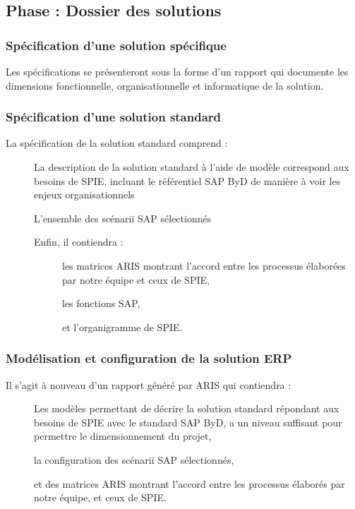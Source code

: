 \subsection{Phase : Dossier des solutions}

\subsubsection{Spécification d’une solution spécifique}

Les spécifications se présenteront sous la forme d’un rapport qui documente les dimensions fonctionnelle, organisationnelle et informatique de la solution.

\subsubsection{Spécification d’une solution standard}

La spécification de la solution standard comprend : \\
\begin{description}
    \item[\textbullet] La description de la solution standard à l’aide de modèle correspond aux besoins de SPIE, incluant le référentiel SAP ByD de manière à voir les enjeux organisationnels
    \item[\textbullet] L’ensemble des scénarii SAP sélectionnés
    \item[\textbullet] Enfin, il contiendra :
        \begin{description}
            \item[\textbullet] les matrices ARIS montrant l’accord entre les processus élaborées par notre équipe et ceux de SPIE,
            \item[\textbullet] les fonctions SAP,
            \item[\textbullet] et l’organigramme de SPIE.
        \end{description}
\end{description}

\subsubsection{Modélisation et configuration de la solution ERP}

Il s’agit à nouveau d’un rapport généré par ARIS qui contiendra : \\

\begin{description}
    \item[\textbullet] Les modèles permettant de décrire la solution standard répondant aux besoins de SPIE avec le standard SAP ByD, a un niveau suffisant pour permettre le dimensionnement du projet, 
    \item[\textbullet] la configuration des scénarii SAP sélectionnés,
    \item[\textbullet] et des matrices ARIS montrant l’accord entre les processus élaborés par notre équipe, et ceux de SPIE.
\end{description}

